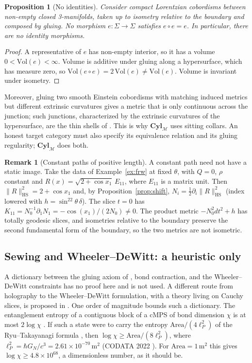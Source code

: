 \documentclass[11pt,a4paper,reqno]{amsart}
\newtheorem{proposition}[theorem]{Proposition}
\theoremstyle{definition}
\newtheorem{remark}[theorem]{Remark}
\numberwithin{equation}{section}
\newcommand{\HS}{\mathrm{HS}}
\newcommand{\Cyl}{\mathbf{Cyl}_{\mathcal{M}}}
\begin{document}
\begin{proposition}[No identities]\label{prop:noid}
Consider compact Lorentzian cobordisms between non-empty closed 3-manifolds, taken up to isometry relative to the boundary and composed by gluing. No morphism $e:\Sigma\to\Sigma$ satisfies $e\circ e=e$. In particular, there are no identity morphisms.
\end{proposition}

\begin{proof}
A representative of $e$ has non-empty interior, so it has a volume $0<\mathrm{Vol}(e)<\infty$. Volume is additive under gluing along a hypersurface, which has measure zero, so $\mathrm{Vol}(e\circ e)=2\,\mathrm{Vol}(e)\neq\mathrm{Vol}(e)$. Volume is invariant under isometry.
\end{proof}

Moreover, gluing two smooth Einstein cobordisms with matching induced metrics but different extrinsic curvatures gives a metric that is only continuous across the junction; such junctions, characterized by the extrinsic curvatures of the hypersurface, are the thin shells of \cite{israel1966}. This is why $\Cyl$ uses sitting collars. An honest target category must also specify its equivalence relation and its gluing regularity; $\Cyl$ does both.

\begin{remark}[Constant paths of positive length]
A constant path need not have a static image. Take the data of Example~\ref{ex:frw} at fixed $\theta$, with $Q=0$, $\rho$ constant and $R(x)=\sqrt{2+\cos x_1}\,E_{11}$, where $E_{11}$ is a matrix unit. Then $\|R\|_{\HS}^2=2+\cos x_1$ and, by Proposition~\ref{prop:shift}, $N_i=\tfrac12\partial_i\|R\|_{\HS}^2$ (index lowered with $h=\sin^22\theta\,\delta$). The slice $t=0$ has $K_{11}=N_0^{-1}\partial_1N_1=-\cos(x_1)/(2N_0)\neq0$. The product metric $-N_0^2dt^2+h$ has totally geodesic slices, and isometries relative to the boundary preserve the second fundamental form of the boundary, so the two metrics are not isometric.
\end{remark}

\subsection{Sewing and Wheeler--DeWitt: a heuristic only}

A dictionary between the gluing axiom of \cite[Sec.~2, axiom~(3b)]{atiyah1988topological}, bond contraction, and the Wheeler--DeWitt constraints \cite{dewitt1967} has no proof here and is not used. A different route from holography to the Wheeler--DeWitt formulation, with a theory living on Cauchy slices, is proposed in \cite{araujoregado2023}. One order of magnitude bounds such a dictionary. The entanglement entropy of a contiguous block of a cMPS of bond dimension $\chi$ is at most $2\log\chi$ \cite{verstraete2010continuous}. If such a state were to carry the entropy $\mathrm{Area}/(4\ell_P^2)$ of the Ryu--Takayanagi formula \cite{ryu2006holographic}, then $\log\chi\ge\mathrm{Area}/(8\ell_P^2)$, where $\ell_P^2=\hbar G_N/c^3=2.61\times10^{-70}\,\mathrm{m}^2$ (CODATA 2022 \cite{mohr2025codata}). For $\mathrm{Area}=1\,\mathrm{m}^2$ this gives $\log\chi\ge4.8\times10^{68}$, a dimensionless number, as it should be.
\end{document}
